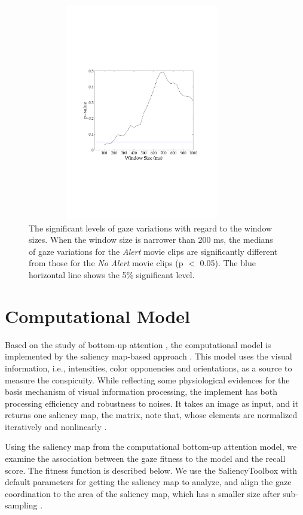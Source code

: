 \documentclass[oneside,master]{snueethesis}
\begin{document}
\begin{figure}
  \centerline{\includegraphics[width=100mm,height=95mm,trim=28mm 75mm 28mm 76mm]{./eps/gaze_var.pdf}}
  \caption[The significant levels of gaze variations with regard to the window sizes]{The significant levels of gaze variations with regard to the window sizes. When the window size is narrower than 200 ms, the medians of gaze variations for the \textit{Alert} movie clips are significantly different from those for the \textit{No Alert} movie clips (p $<$ 0.05). The blue horizontal line shows the 5\% significant level.}
  \label{fig:gaze-variation}
\end{figure}


\section{Computational Model}

Based on the study of bottom-up attention \cite{koch1985shifts}, the computational model is implemented by the saliency map-based approach \cite{itti1998model}. This model uses the visual information, i.e., intensities, color opponencies and orientations, as a source to measure the conspicuity. While reflecting some physiological evidences for the basis mechanism of visual information processing, the implement has both processing efficiency and robustness to noises. It takes an image as input, and it returns one saliency map, the matrix, note that, whose elements are normalized iteratively and nonlinearly \cite{itti2000saliency}.

Using the saliency map from the computational bottom-up attention model, we examine the association between the gaze fitness to the model and the recall score. The fitness function is described below. We use the SaliencyToolbox with default parameters for getting the saliency map to analyze, and align the gaze coordination to the area of the saliency map, which has a smaller size after sub-sampling \cite{Walther2006}.
\end{document}
